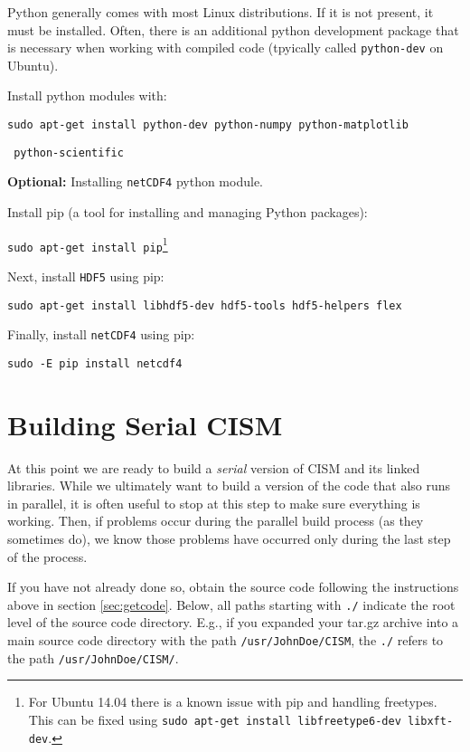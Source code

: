 \begin{mdframed}[style=ubuntu] %
Python generally comes with most Linux distributions.  If it is not present, it must be installed.
Often, there is an additional python development package that is necessary
when working with compiled code (tpyically called \texttt{python-dev} on Ubuntu).

Install python modules with:

\texttt{sudo apt-get install python-dev python-numpy python-matplotlib} 

\texttt{          python-scientific}

\textbf{Optional:} Installing \texttt{netCDF4} python module.

\noindent
Install pip (a tool for installing and managing Python packages):

\texttt{sudo apt-get install pip}\footnote{For Ubuntu 14.04 there is a known issue with pip and handling freetypes. This can be fixed using \texttt{sudo apt-get install libfreetype6-dev libxft-dev}.}

\noindent
Next, install \texttt{HDF5} using pip:

\texttt{sudo apt-get install libhdf5-dev hdf5-tools hdf5-helpers flex}

\noindent
Finally, install \texttt{netCDF4} using pip:

\texttt{sudo -E pip install netcdf4}
\end{mdframed}                 %



\section{Building Serial CISM}
\label{serial-build}
At this point we are ready to build a \textit{serial} version of CISM and its linked libraries. While we ultimately want to build a 
version of the code that also runs in parallel, it is often useful to stop at this step to make sure everything is working. Then, if 
problems occur during the parallel build process (as they sometimes do), we know those problems have occurred only during 
the last step of the process.

If you have not already done so, obtain the source code following the instructions above in section \ref{sec:getcode}. Below, all 
paths starting with \texttt{./} indicate the root level of the source code directory. E.g., if you expanded your tar.gz archive into a main source code 
directory with the path \texttt{/usr/JohnDoe/CISM}, the \texttt{./} refers to the path \texttt{/usr/JohnDoe/CISM/}.  

